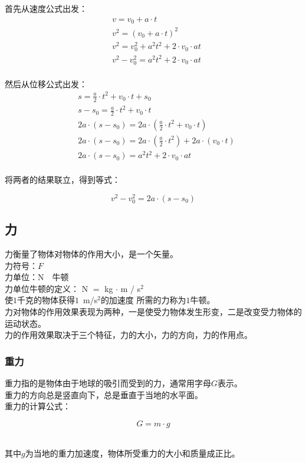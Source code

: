 \documentclass[UTF8]{ctexart}
\begin{document}
    首先从速度公式出发：
    \setcounter{equation}{0}
    \begin{align}
        &v=v_0+a\cdot t\\[4mm]
        &v^2=\left(v_0+a\cdot t\right)^2\\[4mm]
        &v^2=v_0^2+a^2t^2+2\cdot v_0\cdot at\\[4mm]
        &v^2-v_0^2=a^2t^2+2\cdot v_0\cdot at
    \end{align}\\
    然后从位移公式出发：
    \begin{align}
        &s=\frac{a}{2}\cdot t^2+v_0\cdot t+s_0\\[4mm]
        &s-s_0=\frac{a}{2}\cdot t^2+v_0\cdot t\\[4mm]
        &2a\cdot(s-s_0)=2a\cdot\left(\frac{a}{2}\cdot t^2+v_0\cdot t\right)\\[4mm]
        &2a\cdot(s-s_0)=2a\cdot\left(\frac{a}{2}\cdot t^2\right)+2a\cdot(v_0\cdot t)\\[4mm]
        &2a\cdot(s-s_0)=a^2t^2+2\cdot v_0\cdot at
    \end{align}\\
    将两者的结果联立，得到等式：
    \begin{large}
        \begin{equation*}
            v^2-v_0^2=2a\cdot(s-s_0)
        \end{equation*}
    \end{large}

\newpage

\subsection{力}
    力衡量了物体对物体的作用大小，是一个矢量。\\[4mm]
    力符号：$F$\\[1mm]
    力单位：N~~牛顿\\[4mm]
    力单位牛顿的定义：
    N $=$ kg $\cdot$ m / s$^2$\\[2mm]
    使$1$千克的物体获得$1$~m/s$^2$的加速度
    所需的力称为$1$牛顿。\\[5mm]
    力对物体的作用效果表现为两种，一是使受力物体发生形变，二是改变受力物体的运动状态。\\[2mm]
    力的作用效果取决于三个特征，力的大小，力的方向，力的作用点。\vspace{5pt}

\subsubsection{重力}
    重力指的是物体由于地球的吸引而受到的力，通常用字母$G$表示。\\[2mm]
    重力的方向总是竖直向下，总是垂直于当地的水平面。\\[4mm]
    重力的计算公式：
    \begin{large}
        \begin{equation*}
            G=m\cdot g
        \end{equation*}
    \end{large}\\
    其中$g$为当地的重力加速度，物体所受重力的大小和质量成正比。\vspace{8pt}
\end{document}
